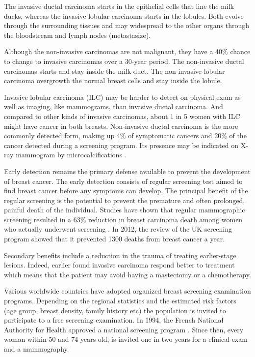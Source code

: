 The invasive ductal carcinoma starts in the epithelial cells that line the milk ducks, whereas the invasive lobular carcinoma starts in the lobules. Both evolve through the surrounding tissues and may widespread to the other organs through the bloodstream and lymph nodes (metastasize). 

Although the non-invasive carcinomas are not malignant, they have a 40\% chance to change to invasive carcinomas over a 30-year period. The non-invasive ductal carcinomas starts and stay inside the milk duct. The non-invasive lobular carcinoma overgrowth the normal breast cells and stay inside the lobule. 

Invasive lobular carcinoma (ILC)  may be harder to detect on physical exam as well as imaging, like mammograms, than invasive ductal carcinoma. And compared to other kinds of invasive carcinomas, about 1 in 5 women with ILC might have cancer in both breasts.  Non-invasive ductal carcinoma is the more commonly detected form, making up 4\% of symptomatic cancers and 20\% of the cancer detected during a screening program. Its presence may be indicated on X-ray mammogram by microcalcifications \citep{acs_cancer_2017}.
 

\label{subsection:cancerscrenning}
Early detection remains the primary defense available to prevent the development of breast cancer. The early detection consists of regular screening test aimed to find breast cancer before any symptoms can develop.  The principal benefit of the regular screening is the potential to prevent the premature and often prolonged, painful death of the individual. Studies have shown that regular mammographic screening resulted in a $63\%$ reduction in breast carcinoma death among women who actually underwent screening \citep{tabar_beyond_2001}. In 2012, the review of the UK screening program \citep{NHSBSP_2012} showed that it prevented 1300 deaths from breast cancer a year. 

Secondary benefits include a reduction in the trauma of treating earlier-stage lesions. Indeed, earlier found invasive carcinoma respond better to treatment which means that the patient may avoid having a mastectomy or a chemotherapy.

Various worldwide countries have adopted organized breast screening examination programs. Depending on the regional statistics and the estimated risk factors (age group, breast density, family history etc) the population is invited to participate to a free screening examination. In 1994, the French National Authority for Health approved a national screening program \citep{HAS_2016}. Since then, every woman within 50 and 74 years old, is invited one in two years for a clinical exam and a mammography.

